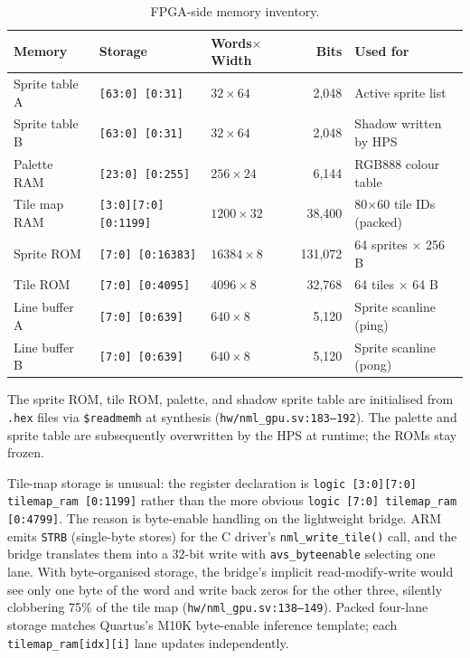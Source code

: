\documentclass[11pt,letterpaper]{article}
\begin{document}
\begin{table}[h]
\centering
\begin{tabular}{lllrl}
\toprule
Memory & Storage & Words$\times$Width & Bits & Used for \\
\midrule
Sprite table A & \texttt{[63:0] [0:31]} & $32\times64$ & 2{,}048 & Active sprite list \\
Sprite table B & \texttt{[63:0] [0:31]} & $32\times64$ & 2{,}048 & Shadow written by HPS \\
Palette RAM & \texttt{[23:0] [0:255]} & $256\times24$ & 6{,}144 & RGB888 colour table \\
Tile map RAM & \texttt{[3:0][7:0] [0:1199]} & $1200\times32$ & 38{,}400 & 80$\times$60 tile IDs (packed) \\
Sprite ROM & \texttt{[7:0] [0:16383]} & $16384\times8$ & 131{,}072 & 64 sprites $\times$ 256 B \\
Tile ROM & \texttt{[7:0] [0:4095]} & $4096\times8$ & 32{,}768 & 64 tiles $\times$ 64 B \\
Line buffer A & \texttt{[7:0] [0:639]} & $640\times8$ & 5{,}120 & Sprite scanline (ping) \\
Line buffer B & \texttt{[7:0] [0:639]} & $640\times8$ & 5{,}120 & Sprite scanline (pong) \\
\bottomrule
\end{tabular}
\caption{FPGA-side memory inventory.}
\label{tab:mem}
\end{table}

The sprite ROM, tile ROM, palette, and shadow sprite table are initialised
from \texttt{.hex} files via \texttt{\$readmemh} at synthesis
(\texttt{hw/nml\_gpu.sv:183--192}). The palette and sprite table are
subsequently overwritten by the HPS at runtime; the ROMs stay frozen.

Tile-map storage is unusual: the register declaration is
\texttt{logic [3:0][7:0] tilemap\_ram [0:1199]} rather than the more
obvious \texttt{logic [7:0] tilemap\_ram [0:4799]}. The reason is byte-enable
handling on the lightweight bridge. ARM emits \texttt{STRB} (single-byte
stores) for the C driver's \texttt{nml\_write\_tile()} call, and the bridge
translates them into a 32-bit write with \texttt{avs\_byteenable} selecting
one lane. With byte-organised storage, the bridge's implicit
read-modify-write would see only one byte of the word and write back zeros
for the other three, silently clobbering 75\% of the tile map
(\texttt{hw/nml\_gpu.sv:138--149}). Packed four-lane storage matches Quartus's
M10K byte-enable inference template; each \texttt{tilemap\_ram[idx][i]} lane
updates independently.
\end{document}
